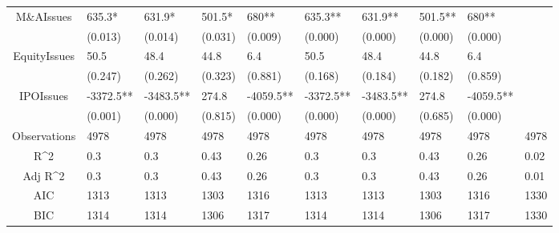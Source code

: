 \documentclass{article}
\begin{document}
\begin{table}[H]
\begin{tabular}{|clllllllll|}
  M\&AIssues & 635.3* & 631.9* & 501.5* & 680** & 635.3** & 631.9** & 501.5** & 680** &  \\ 
   & (0.013) & (0.014) & (0.031) & (0.009) & (0.000) & (0.000) & (0.000) & (0.000) &  \\ 
  EquityIssues & 50.5 & 48.4 & 44.8 & 6.4 & 50.5 & 48.4 & 44.8 & 6.4 &  \\ 
   & (0.247) & (0.262) & (0.323) & (0.881) & (0.168) & (0.184) & (0.182) & (0.859) &  \\ 
  IPOIssues & -3372.5** & -3483.5** & 274.8 & -4059.5** & -3372.5** & -3483.5** & 274.8 & -4059.5** &  \\ 
   & (0.001) & (0.000) & (0.815) & (0.000) & (0.000) & (0.000) & (0.685) & (0.000) &  \\ 
  \hline 
 Observations & 4978 & 4978 & 4978 & 4978 & 4978 & 4978 & 4978 & 4978 & 4978 \\ 
  R^2 & 0.3 & 0.3 & 0.43 & 0.26 & 0.3 & 0.3 & 0.43 & 0.26 & 0.02 \\ 
  Adj R^2 & 0.3 & 0.3 & 0.43 & 0.26 & 0.3 & 0.3 & 0.43 & 0.26 & 0.01 \\ 
  AIC & 1313 & 1313 & 1303 & 1316 & 1313 & 1313 & 1303 & 1316 & 1330 \\ 
  BIC & 1314 & 1314 & 1306 & 1317 & 1314 & 1314 & 1306 & 1317 & 1330 \\ 
   \hline
\end{tabular}
 
\end{table}
\end{document}
